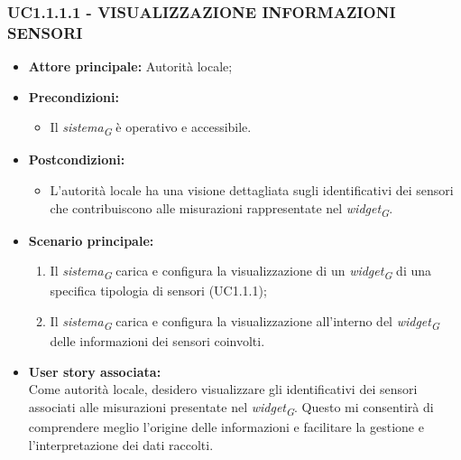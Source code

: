 \subsubsection{UC1.1.1.1 - VISUALIZZAZIONE INFORMAZIONI SENSORI}
\begin{itemize}
    \item \textbf{Attore principale:} Autorità locale;
    \item \textbf{Precondizioni:}
        \begin{itemize}
            \item Il \textit{sistema}\textsubscript{\textit{G}} è operativo e accessibile.
        \end{itemize}
    \item \textbf{Postcondizioni:}
        \begin{itemize}
            \item L’autorità locale ha una visione dettagliata sugli identificativi dei sensori che contribuiscono alle misurazioni rappresentate nel \textit{widget}\textsubscript{\textit{G}}.
        \end{itemize}
    \item \textbf{Scenario principale:}
        \begin{enumerate}
            \item Il \textit{sistema}\textsubscript{\textit{G}} carica e configura la visualizzazione di un \textit{widget}\textsubscript{\textit{G}} di una specifica tipologia di sensori (UC1.1.1);
            \item Il \textit{sistema}\textsubscript{\textit{G}} carica e configura la visualizzazione all'interno del \textit{widget}\textsubscript{\textit{G}} delle informazioni dei sensori coinvolti.
        \end{enumerate}
    \item \textbf{User story associata:} \\
        Come autorità locale, desidero visualizzare gli identificativi dei sensori associati alle misurazioni presentate nel \textit{widget}\textsubscript{\textit{G}}. Questo mi consentirà di comprendere meglio l'origine delle informazioni e facilitare la gestione e l'interpretazione dei dati raccolti.
\end{itemize}


